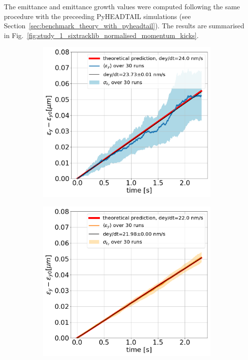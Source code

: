 The emittance and emittance growth values were computed following the same procedure with the preceeding PyHEADTAIL simulations (see Section~\ref{sec:benchmark_theory_with_pyheadtail}). The results are summarised in Fig.~\ref{fig:study_1_sixtracklib_normalised_momentum_kicks}.

\begin{figure}[htp]
    \centering
    \begin{subfigure}{.45\textwidth}
        \centering
        \includegraphics[width=.95\linewidth]{images/Ch6/sixtracklib_study_1_CC_PN_normalised _kicks_in_momentum.png}  
    \end{subfigure}
    \begin{subfigure}{.45\textwidth}
        \centering
        \includegraphics[width=.95\linewidth]{images/Ch6/sixtracklib_study_1_AN_normalised_kicks_momentum.png}

\end{subfigure}
\end{figure}
